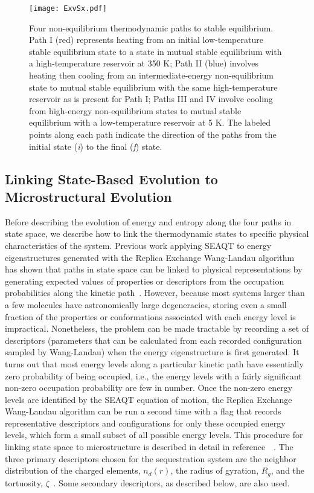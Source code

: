 \documentclass[
journal=jcisd8, %
manuscript=article,
layout=twocolumn   %
]{achemso}
\begin{document}
\begin{figure}[ht!]
	\begin{center}
		\texttt{[image: ExvSx.pdf]}
		\caption{Four non-equilibrium thermodynamic paths to stable equilibrium. Path I (red) represents heating from an initial low-temperature stable equilibrium state to a state in mutual stable equilibrium with a high-temperature reservoir at 350 K; Path II (blue) involves heating then cooling from an intermediate-energy non-equilibrium state to mutual stable equilibrium with the same high-temperature reservoir as is present for Path I; Paths III and IV involve cooling from high-energy non-equilibrium states to mutual stable equilibrium with a low-temperature reservoir at 5 K.  The labeled points along each path indicate the direction of the paths from the initial state ({\em i\/}) to the final ({\em f\/}) state.}
		\label{Thermodynamic_Paths}
	\end{center}
\end{figure}

\subsection{Linking State-Based 
Evolution to Microstructural Evolution}\label{SectionIIE}

Before describing the evolution of energy and entropy along the four paths in state space, we describe how to link the thermodynamic states to specific physical characteristics of the system. Previous work applying SEAQT to energy eigenstructures generated with the Replica Exchange Wang-Landau algorithm has shown that paths in state space can be linked to physical representations by generating expected values of properties or descriptors from the occupation probabilities along the kinetic path~\cite{McDonald2022,Younis2022,2023MvSR_arXiv_brush}. However, because most systems larger than a few molecules have astronomically large degeneracies, storing even a small fraction of the properties or conformations associated with each energy level is impractical.  Nonetheless, the problem can be made tractable by recording a set of descriptors (parameters that can be calculated from each recorded configuration sampled by Wang-Landau) when the energy eigenstructure is first generated. It turns out that most energy levels along a particular kinetic path have essentially zero probability of being occupied, i.e., the energy levels with a fairly significant non-zero occupation probability are few in number. Once the non-zero energy levels are identified by the SEAQT equation of motion, the Replica Exchange Wang-Landau algorithm can be run a second time with a flag that records representative descriptors and  configurations for only these occupied energy levels, which form a small subset of all possible energy levels. This procedure for linking state space to microstructure is described in detail in reference~\cite{McDonald2022}~. The three primary descriptors chosen for the sequestration system are the neighbor distribution of the charged elements, $n_d(r)$, the radius of gyration, $R_g$, and the tortuosity, $\zeta$~\cite{McDonald2023polymer}. Some secondary descriptors, as described below, are also used.
\end{document}
